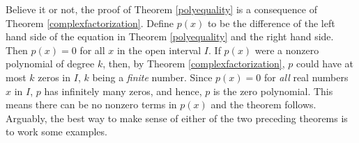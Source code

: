 \smallskip

Believe it or not, the proof of Theorem \ref{polyequality} is a consequence of Theorem \ref{complexfactorization}.  Define $p(x)$ to be the difference of the left hand side of the equation in Theorem \ref{polyequality} and the right hand side.  Then $p(x) = 0$ for all $x$ in the open interval $I$.  If $p(x)$ were a nonzero polynomial of degree $k$, then, by Theorem \ref{complexfactorization}, $p$ could have at most $k$ zeros in $I$, $k$ being a \textit{finite} number.  Since $p(x) = 0$ for \textit{all} real numbers $x$ in $I$, $p$ has infinitely many zeros, and hence, $p$ is the zero polynomial.  This means there can be no nonzero terms in $p(x)$ and the theorem follows.  Arguably, the best way to make sense of either of the two preceding theorems is to work some examples.  

